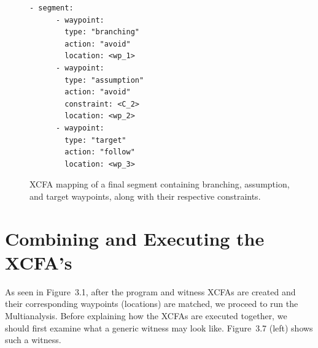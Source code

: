 \begin{figure}[H]
  \centering
  \begin{minipage}[t]{0.35\textwidth}
    \begin{lstlisting}[style=c, columns=flexibl]
    - segment:
      - waypoint:
        type: "branching"
        action: "avoid"
        location: <wp_1>
      - waypoint:
        type: "assumption"
        action: "avoid"
        constraint: <C_2>
        location: <wp_2>
      - waypoint:
        type: "target"
        action: "follow"
        location: <wp_3>
    \end{lstlisting}
    \end{minipage}
  \caption{XCFA mapping of a final segment containing branching, assumption, and target waypoints, along with their respective constraints.}
  \label{fig:combined}
\end{figure}


\section{Combining and Executing the XCFA's}
As seen in Figure~3.1, after the program and witness XCFAs are created and their 
corresponding waypoints (locations) are matched, we proceed to run the Multianalysis. 
Before explaining how the XCFAs are executed together, we should first examine what 
a generic witness may look like. Figure~3.7 (left) shows such a witness.

